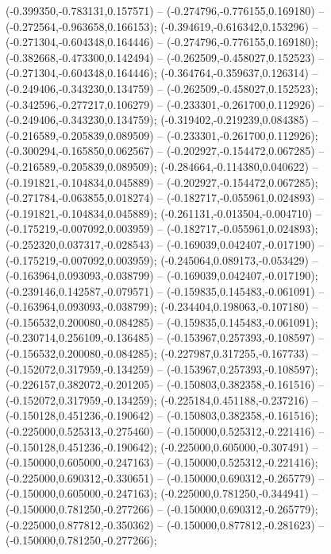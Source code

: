  (-0.399350,-0.783131,0.157571) -- (-0.274796,-0.776155,0.169180) -- (-0.272564,-0.963658,0.166153);
 (-0.394619,-0.616342,0.153296) -- (-0.271304,-0.604348,0.164446) -- (-0.274796,-0.776155,0.169180);
 (-0.382668,-0.473300,0.142494) -- (-0.262509,-0.458027,0.152523) -- (-0.271304,-0.604348,0.164446);
 (-0.364764,-0.359637,0.126314) -- (-0.249406,-0.343230,0.134759) -- (-0.262509,-0.458027,0.152523);
 (-0.342596,-0.277217,0.106279) -- (-0.233301,-0.261700,0.112926) -- (-0.249406,-0.343230,0.134759);
 (-0.319402,-0.219239,0.084385) -- (-0.216589,-0.205839,0.089509) -- (-0.233301,-0.261700,0.112926);
 (-0.300294,-0.165850,0.062567) -- (-0.202927,-0.154472,0.067285) -- (-0.216589,-0.205839,0.089509);
 (-0.284664,-0.114380,0.040622) -- (-0.191821,-0.104834,0.045889) -- (-0.202927,-0.154472,0.067285);
 (-0.271784,-0.063855,0.018274) -- (-0.182717,-0.055961,0.024893) -- (-0.191821,-0.104834,0.045889);
 (-0.261131,-0.013504,-0.004710) -- (-0.175219,-0.007092,0.003959) -- (-0.182717,-0.055961,0.024893);
 (-0.252320,0.037317,-0.028543) -- (-0.169039,0.042407,-0.017190) -- (-0.175219,-0.007092,0.003959);
 (-0.245064,0.089173,-0.053429) -- (-0.163964,0.093093,-0.038799) -- (-0.169039,0.042407,-0.017190);
 (-0.239146,0.142587,-0.079571) -- (-0.159835,0.145483,-0.061091) -- (-0.163964,0.093093,-0.038799);
 (-0.234404,0.198063,-0.107180) -- (-0.156532,0.200080,-0.084285) -- (-0.159835,0.145483,-0.061091);
 (-0.230714,0.256109,-0.136485) -- (-0.153967,0.257393,-0.108597) -- (-0.156532,0.200080,-0.084285);
 (-0.227987,0.317255,-0.167733) -- (-0.152072,0.317959,-0.134259) -- (-0.153967,0.257393,-0.108597);
 (-0.226157,0.382072,-0.201205) -- (-0.150803,0.382358,-0.161516) -- (-0.152072,0.317959,-0.134259);
 (-0.225184,0.451188,-0.237216) -- (-0.150128,0.451236,-0.190642) -- (-0.150803,0.382358,-0.161516);
 (-0.225000,0.525313,-0.275460) -- (-0.150000,0.525312,-0.221416) -- (-0.150128,0.451236,-0.190642);
 (-0.225000,0.605000,-0.307491) -- (-0.150000,0.605000,-0.247163) -- (-0.150000,0.525312,-0.221416);
 (-0.225000,0.690312,-0.330651) -- (-0.150000,0.690312,-0.265779) -- (-0.150000,0.605000,-0.247163);
 (-0.225000,0.781250,-0.344941) -- (-0.150000,0.781250,-0.277266) -- (-0.150000,0.690312,-0.265779);
 (-0.225000,0.877812,-0.350362) -- (-0.150000,0.877812,-0.281623) -- (-0.150000,0.781250,-0.277266);
